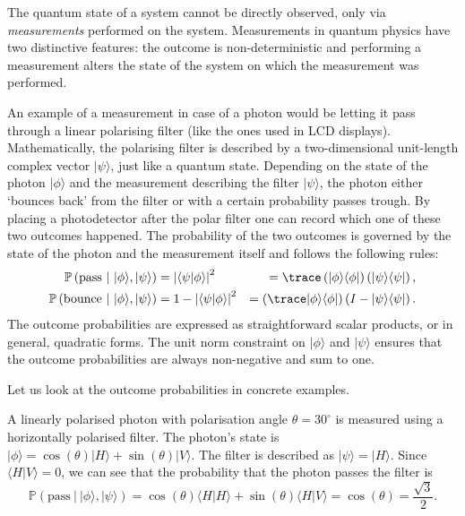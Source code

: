 The quantum state of a system cannot be directly observed, only via \emph{measurements} performed on the system. Measurements in quantum physics have two distinctive features: the outcome is non-deterministic and performing a measurement alters the state of the system on which the measurement was performed.

An example of a measurement in case of a photon would be letting it pass through a linear polarising filter (like the ones used in LCD displays). Mathematically, the polarising filter is described by a two-dimensional unit-length complex vector $\vert\psi\rangle$, just like a quantum state. Depending on the state of the photon $\vert\phi\rangle$ and the measurement describing the filter $\vert\psi\rangle$, the photon either `bounces back' from the filter or with a certain probability passes trough. By placing a photodetector after the polar filter one can record which one of these two outcomes happened. The probability of the two outcomes is governed by the state of the photon and the measurement itself and follows the following rules:
%
\begin{align}
	\mathbb{P}\left( \mbox{pass}\ \vert\ \vert\phi\rangle , \vert\psi\rangle \right) &= \left\vert\langle\psi\vert\phi\rangle\right\vert^2 &= \trace\left(\vert\phi\rangle\langle\phi\vert\right)\left(\vert\psi\rangle\langle\psi\vert\right),\\
	\mathbb{P}\left( \mbox{bounce}\ \vert\ \vert\phi\rangle , \vert\psi\rangle \right) &= 1 - \left\vert\langle\psi\vert\phi\rangle\right\vert^2 &= \left(\trace\vert\phi\rangle\langle\phi\vert\right)\left(I - \vert\psi\rangle\langle\psi\vert\right).
\end{align}
%
The outcome probabilities are expressed as straightforward scalar products, or in general, quadratic forms. The unit norm constraint on $\vert\phi\rangle$ and $\vert\psi\rangle$ ensures that the outcome probabilities are always non-negative and sum to one.

Let us look at the outcome probabilities in concrete examples.

\begin{example}
A linearly polarised photon with polarisation angle $\theta = 30^{\circ}$	 is measured using a horizontally polarised filter. The photon's state is $\vert\phi\rangle = \cos(\theta)\vert H \rangle + \sin(\theta)\vert V \rangle$. The filter is described as $\vert\psi\rangle = \vert H \rangle$. Since $\langle H \vert V \rangle = 0$, we can see that the probability that the photon passes the filter is
%
\begin{equation}
	\mathbb{P}\left( \mbox{pass}\ \vert\ \vert\phi\rangle , \vert\psi\rangle \right) = \cos(\theta)\langle H \vert H \rangle + \sin(\theta) \langle H \vert V \rangle = \cos(\theta) = \frac{\sqrt{3}}{2}.
\end{equation}\end{example}

